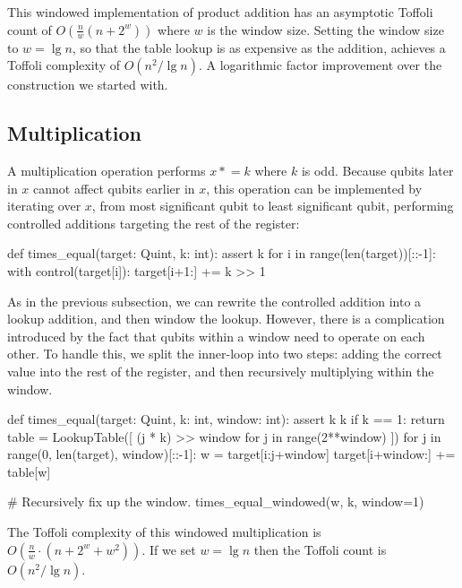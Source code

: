 \documentclass[onecolumn,unpublished]{quantumarticle}
\theoremstyle{definition}
\theoremstyle{definition}
\theoremstyle{definition}
\newcommand{\timeseq}{\mathrel{\ast}=}
\begin{document}
This windowed implementation of product addition has an asymptotic Toffoli count of $O(\frac{n}{w} (n + 2^w))$ where $w$ is the window size.
Setting the window size to $w=\lg n$, so that the table lookup is as expensive as the addition, achieves a Toffoli complexity of $O(n^2/\lg n)$.
A logarithmic factor improvement over the construction we started with.


\subsection{Multiplication}

A multiplication operation performs $x \timeseq k$ where $k$ is odd.
Because qubits later in $x$ cannot affect qubits earlier in $x$, this operation can be implemented by iterating over $x$, from most significant qubit to least significant qubit, performing controlled additions targeting the rest of the register:

\begin{python}
    def times_equal(target: Quint, k: int):
        assert k %
        for i in range(len(target))[::-1]:
            with control(target[i]):
                target[i+1:] += k >> 1
\end{python}

As in the previous subsection, we can rewrite the controlled addition into a lookup addition, and then window the lookup.
However, there is a complication introduced by the fact that qubits within a window need to operate on each other.
To handle this, we split the inner-loop into two steps: adding the correct value into the rest of the register, and then recursively multiplying within the window.

\begin{python}
    def times_equal(target: Quint, k: int, window: int):
        assert k %
        k %
        if k == 1:
            return
        table = LookupTable([
            (j * k) >> window
            for j in range(2**window)
        ])
        for j in range(0, len(target), window)[::-1]:
            w = target[i:j+window]
            target[i+window:] += table[w]

            # Recursively fix up the window.
            times_equal_windowed(w, k, window=1)
\end{python}

The Toffoli complexity of this windowed multiplication is $O(\frac{n}{w} \cdot (n + 2^w + w^2))$.
If we set $w = \lg n$ then the Toffoli count is $O(n^2/\lg n)$.
\end{document}

